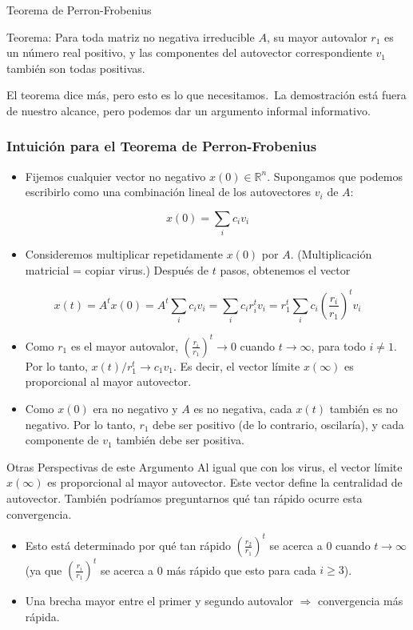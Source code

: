 \documentclass[11pt]{beamer}
\begin{document}
\begin{frame}{Teorema de Perron-Frobenius}
\begin{block}{Teorema:}
    Para toda matriz no negativa irreducible $A$, su mayor autovalor $r_{1}$ es un número real positivo, y las componentes del autovector correspondiente $v_{1}$ también son todas positivas.
\end{block}
El teorema dice más, pero esto es lo que necesitamos.\
La demostración está fuera de nuestro alcance, pero podemos dar un argumento informal informativo.
\end{frame}
\begin{frame}[allowframebreaks]
\frametitle{Intuición para el Teorema de Perron-Frobenius}
\begin{itemize}
\item Fijemos cualquier vector no negativo $x(0) \in \mathbb{R}^{n}$. Supongamos que podemos escribirlo como una combinación lineal de los autovectores $v_{i}$ de $A$:
\end{itemize}
$$
x(0)=\sum_{i} c_{i} v_{i}
$$
\begin{itemize}
\item Consideremos multiplicar repetidamente $x(0)$ por $A$. (Multiplicación matricial = copiar virus.) Después de $t$ pasos, obtenemos el vector
\end{itemize}
$$
x(t)=A^{t} x(0)=A^{t} \sum_{i} c_{i} v_{i}=\sum_{i} c_{i} r_{i}^{t} v_{i}=r_{1}^{t} \sum_{i} c_{i}\left(\frac{r_{i}}{r_{1}}\right)^{t} v_{i}
$$
\begin{itemize}
\item Como $r_{1}$ es el mayor autovalor, $\left(\frac{r_{i}}{r_{1}}\right)^{t} \rightarrow 0$ cuando $t \rightarrow \infty$, para todo $i \neq 1$. Por lo tanto, $x(t) / r_{1}^{t} \rightarrow c_{1} v_{1}$. Es decir, el vector límite $x(\infty)$ es proporcional al mayor autovector.
\item Como $x(0)$ era no negativo y $A$ es no negativa, cada $x(t)$ también es no negativo. Por lo tanto, $r_{1}$ debe ser positivo (de lo contrario, oscilaría), y cada componente de $v_{1}$ también debe ser positiva.
\end{itemize}
\end{frame}

\begin{frame}{Otras Perspectivas de este Argumento}
Al igual que con los virus, el vector límite $x(\infty)$ es proporcional al mayor autovector. Este vector define la centralidad de autovector.
También podríamos preguntarnos qué tan rápido ocurre esta convergencia.
\begin{itemize}
\item Esto está determinado por qué tan rápido $\left(\frac{r_{2}}{r_{1}}\right)^{t}$ se acerca a 0 cuando $t \rightarrow \infty$ (ya que $\left(\frac{r_{i}}{r_{1}}\right)^{t}$ se acerca a 0 más rápido que esto para cada $i \geq 3$).
\item Una brecha mayor entre el primer y segundo autovalor $\Longrightarrow$ convergencia más rápida.
\end{itemize}
    
\end{frame}
\end{document}
